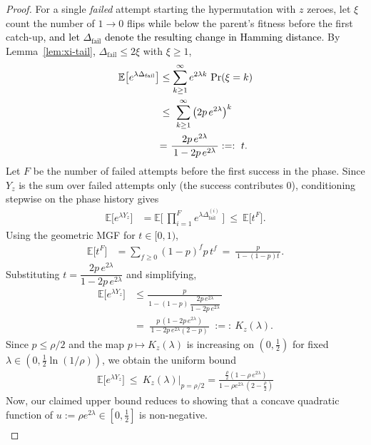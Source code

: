 \documentclass[lettersize,journal]{IEEEtran}
\newcommand{\rerev}[1]{\textcolor{black}{#1}}
\newcommand{\EE}{\mathbb{E}}
\begin{document}
{\begin{proof}
	For a single \emph{failed} attempt starting the hypermutation with $z$ zeroes, let $\xi$ count the number of $1\!\to 0$ flips while below the parent's fitness before the first catch-up\rerev{, and let $\Delta_{\mathrm{fail}}$ denote the resulting change in Hamming distance}.
	By Lemma~\ref{lem:xi-tail}\rerev{,} $\Delta_{\mathrm{fail}}\le 2\xi$ with $\xi\ge 1$,
	\begin{align*}
		\EE\!\left[e^{\lambda \Delta_{\mathrm{fail}}}\right]
		&\le \sum_{k\ge 1}^{\infty} e^{2\lambda k}\,\Pr(\xi=k)
		\\ &\le\ \sum_{k\ge 1}^{\infty} \big(2p\,e^{2\lambda}\big)^{k}
		\\ &\textcolor{black}{=}\ \frac{2p\,e^{2\lambda}}{\,1-2p\,e^{2\lambda}\,}:=:\ t.
	\end{align*}
	Let $F$ be the number of failed attempts before the first success in the phase. Since $Y_z$ is the sum over failed attempts only (the success contributes $0$), conditioning stepwise on the phase history gives
	\begin{align*}
		\EE\!\big[e^{\lambda Y_z}\big]
		&=\EE\!\Big[\ \prod_{i=1}^{F} e^{\lambda \Delta_{\mathrm{fail}}^{(i)}}\ \Big]
		\ \le\ \EE\!\big[t^{F}\big].
	\end{align*}
	Using the geometric MGF for $t\in[0,1)$,
	\begin{align*}
		\EE\!\big[t^{F}\big]
		&=
		 \sum_{f\ge 0} (1-p)^f p\, t^f
		\ =\ \frac{p}{\,1-(1-p)t\,}.
	\end{align*}
	Substituting $t=\dfrac{2p\,e^{2\lambda}}{1-2p\,e^{2\lambda}}$ and simplifying,
	\begin{align*}
		\EE\!\big[e^{\lambda Y_z}\big]
		&\le \frac{p}{\,1-(1-p)\,\dfrac{2p\,e^{2\lambda}}{1-2p\,e^{2\lambda}}\,}
		\\ &=\ \frac{p\,(1-2p\,e^{2\lambda})}{\,1-2p\,e^{2\lambda}(2-p)\,}
		\ :=:\ K_z(\lambda).
	\end{align*}
	Since $p\le \rho/2$ and the map $p\mapsto K_z(\lambda)$ is increasing on $(0,\tfrac12)$ for fixed $\lambda\in(0,\tfrac12\ln(1/\rho))$, we obtain the uniform bound
	\begin{align*}
		\EE\!\big[e^{\lambda Y_z}\big]
		\ \le\ K_z(\lambda)\Big|_{p=\rho/2}=\frac{\tfrac{\rho}{2}(1-\rho\,e^{2\lambda})}{1-\rho e^{2\lambda}\,(2-\tfrac{\rho}{2})}
	\end{align*}
	Now, our claimed upper bound reduces to showing that a concave quadratic function of $u:=\rho e^{2\lambda} \in \left[0,\frac{1}{2}\right]$ is non-negative.
	\begin{align*}

\end{align*}
\end{proof}}
\end{document}
